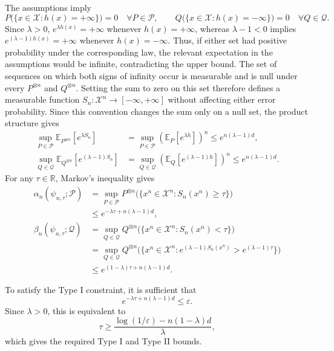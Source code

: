 \documentclass[journal,12pt,draftclsnofoot,onecolumn]{IEEEtran}
\begin{document}
\begin{IEEEproof} The assumptions imply
\begin{equation*}
P\bigl(\{x\in\mathcal X:h(x)=+\infty\}\bigr)=0
\quad \forall P\in\mathcal P,
\qquad Q\bigl(\{x\in\mathcal X:h(x)=-\infty\}\bigr)=0
\quad \forall Q\in\mathcal Q.
\end{equation*}
Since $\lambda>0$, $e^{\lambda h(x)}=+\infty$ whenever $h(x)=+\infty$, whereas $\lambda-1<0$ implies $e^{(\lambda-1)h(x)}=+\infty$ whenever $h(x)=-\infty$. Thus, if either set had positive probability under the corresponding law, the relevant expectation in the assumptions would be infinite, contradicting the upper bound. The set of sequences on which both signs of infinity occur is measurable and is null under every $P^{\otimes n}$ and $Q^{\otimes n}$. Setting the sum to zero on this set therefore defines a measurable function $S_n:\mathcal X^n\to[-\infty,+\infty]$ without affecting either error probability. Since this convention changes the sum only on a null set,
the product structure gives
\begin{equation*}
\begin{aligned}
\sup_{P\in\mathcal P}\mathbb E_{P^{\otimes n}}\left[e^{\lambda S_n}\right]&=\sup_{P\in\mathcal P}\left(\mathbb E_P[e^{\lambda h}] \right)^n \leq e^{n(\lambda-1)d}, \\ \sup_{Q\in\mathcal Q} \mathbb E_{Q^{\otimes n}} \left[e^{(\lambda-1)S_n}\right] &= \sup_{Q\in\mathcal Q} \left( \mathbb E_Q[e^{(\lambda-1)h}] \right)^n \leq e^{n(\lambda-1)d}.
\end{aligned}
\end{equation*}
For any $\tau\in\mathbb R$, Markov's inequality gives
\begin{equation*}
\begin{aligned}
\alpha_n(\psi_{n,\tau};\mathcal P) &= \sup_{P\in\mathcal P} P^{\otimes n}\bigl(\{x^n\in\mathcal X^n:S_n(x^n)\geq\tau\}\bigr) \\ &\leq e^{-\lambda\tau+n(\lambda-1)d}, \\ \beta_n(\psi_{n,\tau};\mathcal Q) &= \sup_{Q\in\mathcal Q} Q^{\otimes n}\bigl(\{x^n\in\mathcal X^n:S_n(x^n)<\tau\}\bigr) \\ &= \sup_{Q\in\mathcal Q} Q^{\otimes n} \bigl( \{x^n\in\mathcal X^n: e^{(\lambda-1)S_n(x^n)}>e^{(\lambda-1)\tau}\} \bigr) \\ &\leq e^{(1-\lambda)\tau+n(\lambda-1)d}.
\end{aligned}
\end{equation*}

To satisfy the Type I constraint, it is sufficient that
\begin{equation*}
e^{-\lambda\tau+n(\lambda-1)d}\leq\varepsilon.
\end{equation*}
Since $\lambda>0$, this is equivalent to
\begin{equation*}
\tau \geq \frac{\log(1/\varepsilon)-n(1-\lambda)d}{\lambda},
\end{equation*}
which gives the required Type I and Type II bounds.
\end{IEEEproof}
\end{document}
